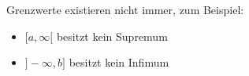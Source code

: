 Grenzwerte existieren nicht immer, zum Beispiel:
\begin{itemize}
    \item $[a, \infty[$ besitzt kein Supremum
    \item $]-\infty, b]$ besitzt kein Infimum
\end{itemize}
